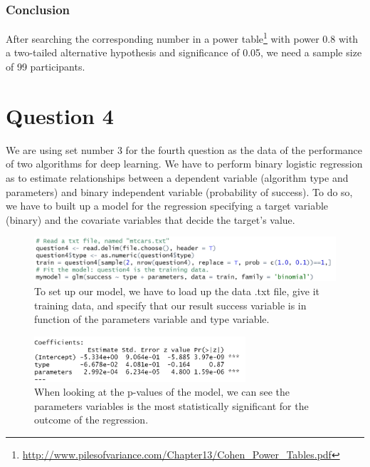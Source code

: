 \documentclass[14]{article}
\begin{document}
\subsubsection{Conclusion}
After searching the corresponding number in a power table\footnote{\protect\url{http://www.pilesofvariance.com/Chapter13/Cohen\_Power\_Tables.pdf}} with power 0.8 with a two-tailed alternative hypothesis and significance of 0.05, we need a sample size of 99 participants.


\section{Question 4}
We are using set number 3 for the fourth question as the data of the performance of two algorithms for deep learning. We have to perform binary logistic regression as to estimate relationships between a dependent variable (algorithm type and parameters) and binary independent variable (probability of success). To do so, we have to built up a model for the regression specifying a target variable (binary) and the covariate variables that decide the target's value.

\begin{figure}[!htb]
	\includegraphics[width=1.0\textwidth]{img/question4/question4_model_code.PNG}
	\captionsetup{width=1.0\textwidth}
	\centering 
	\caption{To set up our model, we have to load up the data .txt file, give it training data, and specify that our result success variable is in function of the parameters variable and type variable. }
\end{figure}

\begin{figure}[!htb]
	\includegraphics[width=0.7\textwidth]{img/question4/question4_model_coef.PNG}
	\captionsetup{width=1.0\textwidth}
	\centering 
	\caption{When looking at the p-values of the model, we can see the parameters variables is the most statistically significant for the outcome of the regression. }
\end{figure}
\end{document}
